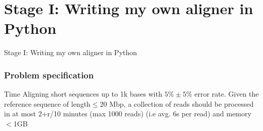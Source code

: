 \begin{frame}[fragile]
\begin{center}
  \end{center}

\end{frame}


\section{Stage I: Writing my own aligner in Python}
\begin{frame}[plain,c]
\begin{center}
\Huge Stage I: Writing my own aligner in Python
\end{center}
\end{frame}

\begin{frame}
  \frametitle{Problem specification}

  \begin{exampleblock}{Time}
  Aligning short sequences up to 1k bases with $5\% \pm 5\%$ error rate.
  Given the reference sequence of length$\le$20 Mbp, a collection of reads should be processed in at most 2+r/10 minutes (max 1000 reads) (i.e avg. 6s per read) and memory$<$1GB
  \end{exampleblock}
\end{frame}


